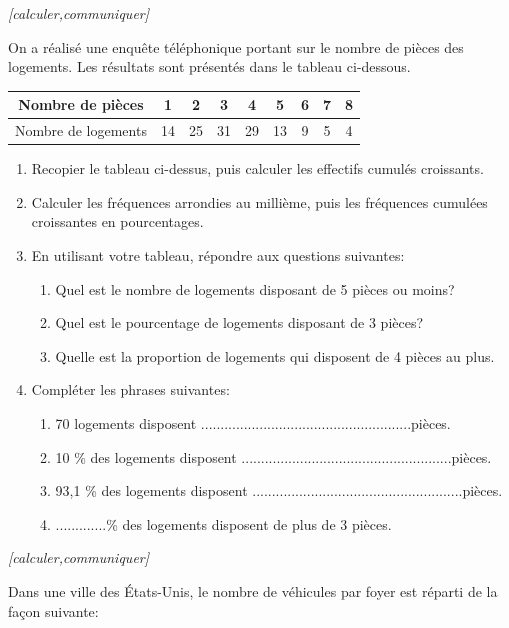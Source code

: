 \exo \textit{[calculer,communiquer]}

On a réalisé une enquête téléphonique portant sur le nombre de pièces des logements. Les résultats sont présentés dans le tableau ci-dessous.

\begin{center}
\begin{tabular}{*{9}{|c}|}
\hline
Nombre de pièces &  1 & 2 & 3& 4& 5& 6& 7& 8 \tabularnewline
\hline
Nombre de logements & 14& 25 & 31 & 29 & 13 & 9 &  5& 4 \tabularnewline
\hline
\end{tabular}
\end{center}

\begin{enumerate}
\item Recopier le tableau ci-dessus, puis calculer les effectifs cumulés croissants.
\item Calculer les fréquences arrondies au millième, puis les fréquences cumulées croissantes en pourcentages.
\item En utilisant votre tableau, répondre aux questions suivantes:
\begin{enumerate}
\item Quel est le nombre de logements disposant de 5 pièces ou moins?
\item Quel est le pourcentage de logements disposant de 3 pièces?
\item Quelle est la proportion de logements qui disposent de 4 pièces au plus.
\end{enumerate}
\item Compléter les phrases suivantes:
\begin{enumerate}
\item 70 logements disposent ......................................................pièces.
\item 10 \% des logements disposent ......................................................pièces.
\item 93,1 \% des logements disposent ......................................................pièces.
\item .............\% des logements disposent de plus de 3 pièces.
\end{enumerate}
\end{enumerate}

\exo  \textit{[calculer,communiquer]} 

Dans une ville des États-Unis, le nombre de véhicules par foyer est réparti de la façon suivante:

